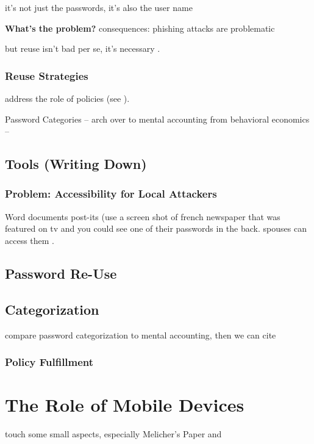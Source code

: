 	it's not just the passwords, it's also the user name 
	
	
	\textbf{What's the problem?}
	consequences: phishing attacks are problematic
	
	but reuse isn't bad per se, it's necessary \cite{Florencio2014PasswordPortfoliosFiniteUser}. 
	
	
	
	
	\subsubsection{Reuse Strategies}
	address the role of policies (see \cite{Seitz2017PoliciesReuse}).
	
	Password Categories -- arch over to mental accounting from behavioral economics -- \cite{Thaler2004}
	
	\cite{Stobert2015ExpertPassword}
	
	
	\subsection{Tools (Writing Down)}
		\subsubsection{Problem: Accessibility for Local Attackers}
Word documents post-its (use a screen shot of french newspaper that was featured on tv and you could see one of their passwords in the back. spouses can access them .

	\subsection{Password Re-Use}
	
	
	
		\subsection{Categorization}
		compare password categorization to mental accounting, then we can cite \cite{Stockinger2015TowardsBE}
		\subsubsection{Policy Fulfillment}

\section{The Role of Mobile Devices}
touch some small aspects, especially Melicher's Paper \cite{Melicher2016UsabilityMobileTextPasswords} and \cite{VonZezschwitz2014HoneyIShrunkTheKeys}
\cite{Haque2014PsychometricsStrongPassword} 

